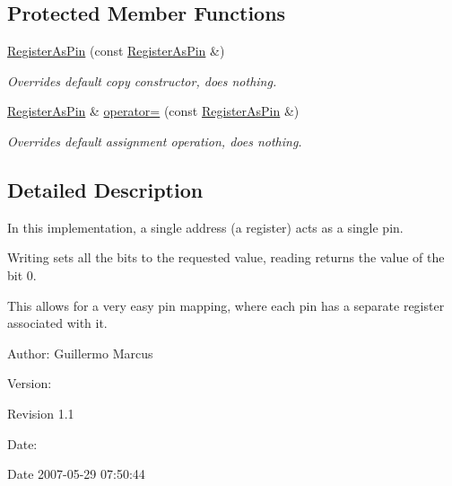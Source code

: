 \subsection*{Protected Member Functions}
\begin{CompactItemize}
\item 
\hyperlink{classmprace_1_1RegisterAsPin_b0}{Register\-As\-Pin} (const \hyperlink{classmprace_1_1RegisterAsPin}{Register\-As\-Pin} \&)
\begin{CompactList}\small\item\em Overrides default copy constructor, does nothing. \item\end{CompactList}\item 
\hyperlink{classmprace_1_1RegisterAsPin}{Register\-As\-Pin} \& \hyperlink{classmprace_1_1RegisterAsPin_b1}{operator=} (const \hyperlink{classmprace_1_1RegisterAsPin}{Register\-As\-Pin} \&)
\begin{CompactList}\small\item\em Overrides default assignment operation, does nothing. \item\end{CompactList}\end{CompactItemize}


\subsection{Detailed Description}
In this implementation, a single address (a register) acts as a single pin. 

Writing sets all the bits to the requested value, reading returns the value of the bit 0.

This allows for a very easy pin mapping, where each pin has a separate register associated with it.

\begin{Desc}
\item[Author:]Guillermo Marcus \end{Desc}
\begin{Desc}
\item[Version:]\begin{Desc}
\item[Revision]1.1 \end{Desc}
\end{Desc}
\begin{Desc}
\item[Date:]\begin{Desc}
\item[Date]2007-05-29 07:50:44 \end{Desc}
\end{Desc}




